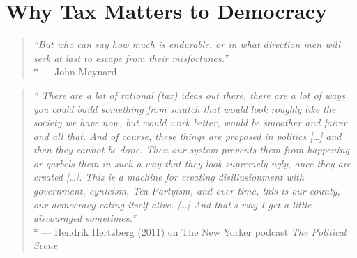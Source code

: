 
\section{Why Tax Matters to Democracy}

\begin{quote}
	\emph{``But who can say how much is endurable, or in what direction men will seek at last to escape from their misfortunes.''}
	\\*
	--- John Maynard \citet{Keynes1936}
\end{quote}

\begin{quote}
	\emph{``
	There are a lot of rational (tax) ideas out there, there are a lot of ways you could build something from scratch that would look roughly like the society we have now, but would work better, would be smoother and fairer and all that.
	And of course, these things are proposed in politics [\ldots] and then they cannot be done.
	Then our system prevents them from happening or garbels them in such a way that they look supremely ugly, once they are created [\ldots].
	This is a machine for creating disillusionment with government, cynicism, Tea-Partyism, and over time, this is our county, our democracy eating itself alive.
	[\ldots]
	And that's why I get a little discouraged sometimes.''}
	\\*
	--- Hendrik Hertzberg (2011) on The New Yorker podcast \emph{The Political Scene}
\end{quote}


